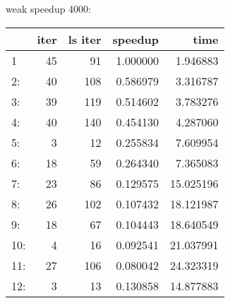 \documentclass[11pt,a4paper]{article}
\begin{document}
\\ 
\\ 
 weak speedup 4000:
\\ 
\begin{tabular}{lrrrr}
\toprule
{} &  iter &  ls iter &   speedup &       time \\
\midrule
1   &    45 &       91 &  1.000000 &   1.946883 \\
2:  &    40 &      108 &  0.586979 &   3.316787 \\
3:  &    39 &      119 &  0.514602 &   3.783276 \\
4:  &    40 &      140 &  0.454130 &   4.287060 \\
5:  &     3 &       12 &  0.255834 &   7.609954 \\
6:  &    18 &       59 &  0.264340 &   7.365083 \\
7:  &    23 &       86 &  0.129575 &  15.025196 \\
8:  &    26 &      102 &  0.107432 &  18.121987 \\
9:  &    18 &       67 &  0.104443 &  18.640549 \\
10: &     4 &       16 &  0.092541 &  21.037991 \\
11: &    27 &      106 &  0.080042 &  24.323319 \\
12: &     3 &       13 &  0.130858 &  14.877883 \\
\bottomrule
\end{tabular}
\end{document}
